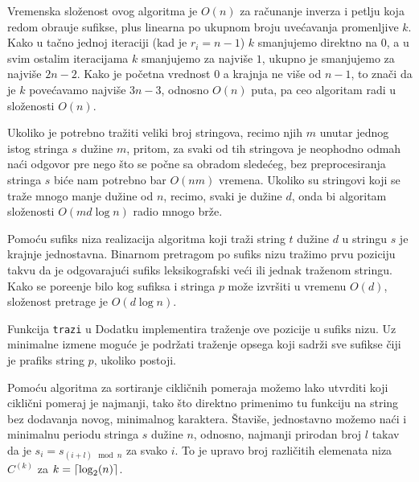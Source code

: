 Vremenska slo\v zenost ovog algoritma je $O(n)$ za ra\v cunanje inverza i petlju koja redom obra\dj uje sufikse, plus linearna po ukupnom broju uve\' cavanja promenljive $k$. Kako u ta\v cno jednoj iteraciji (kad je $r_i = n-1$) $k$ smanjujemo direktno na $0$, a u svim ostalim iteracijama $k$ smanjujemo za najvi\v se $1$, ukupno je smanjujemo za najvi\v se $2n-2$. Kako je po\v cetna vrednost $0$ a krajnja ne vi\v se od $n-1$, to zna\v ci da je $k$ pove\' cavamo najvi\v se $3n-3$, odnosno $O(n)$ puta, pa ceo algoritam radi u slo\v zenosti $O(n)$.



Ukoliko je potrebno tra\v ziti veliki broj stringova, recimo njih $m$ unutar jednog istog stringa $s$ du\v zine $m$, pritom, za svaki od tih stringova je neophodno odmah na\' ci odgovor pre nego \v sto se po\v cne sa obradom slede\' ceg, bez preprocesiranja stringa $s$ bi\' ce nam potrebno bar $O(nm)$ vremena. Ukoliko su stringovi koji se tra\v ze mnogo manje du\v zine od $n$, recimo, svaki je du\v zine $d$, onda bi algoritam slo\v zenosti $O(md\log n)$ radio mnogo br\v ze.

Pomo\' cu sufiks niza realizacija algoritma koji tra\v zi string $t$ du\v zine $d$ u stringu $s$ je krajnje jednostavna. Binarnom pretragom po sufiks nizu tra\v zimo prvu poziciju takvu da je odgovaraju\' ci sufiks leksikografski ve\' ci ili jednak tra\v zenom stringu. Kako se pore\dj enje bilo kog sufiksa i stringa $p$ mo\v ze izvr\v siti u vremenu $O(d)$, slo\v zenost pretrage je $O(d \log n)$.

Funkcija \texttt{trazi} u Dodatku \sirdodatakkod{} implementira tra\v zenje ove pozicije u sufiks nizu. Uz minimalne izmene mogu\' ce je podr\v zati tra\v zenje opsega koji sadr\v zi sve sufikse \v ciji je prafiks string $p$, ukoliko postoji.


Pomo\' cu algoritma za sortiranje cikli\v cnih pomeraja mo\v zemo lako utvrditi koji cikli\v cni pomeraj je najmanji, tako \v sto direktno primenimo tu funkciju na string bez dodavanja novog, minimalnog karaktera. \v Stavi\v se, jednostavno mo\v zemo na\' ci i minimalnu periodu stringa $s$ du\v zine $n$, odnosno, najmanji prirodan broj $l$ takav da je $s_i = s_{(i+l) \mod n}$ za svako $i$. To je upravo broj razli\v citih elemenata niza $C^{(k)}$ za $k = \left \lceil \log_2(n) \right \rceil$.

